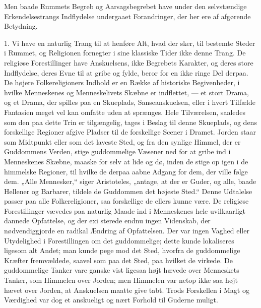 \documentclass[12pt,a4paper]{article}
\newcommand{\opage}[1]{\marginnote{\footnotesize\textit{[#1]}}}
\begin{document}
Men baade Rummets Begreb og Aarsagsbegrebet have under den selvstændige
Erkendelsestrangs Indflydelse undergaaet Forandringer, der her ere af
afgørende Betydning.

\medskip

1. Vi have en naturlig Trang til at henføre Alt, hvad der sker, til
bestemte Steder i Rummet, og Religionen fornegter i sine klassiske Tider
ikke denne Trang. De religiøse Forestillinger have Anskuelsens, ikke
Begrebets Karakter, og deres store Indflydelse, deres Evne til at gribe og
fylde, beror for en ikke ringe Del derpaa. De højere Folkereligioners
Indhold er en Række af historiske Begivenheder, i hvilke Menneskenes og
Menneskelivets Skæbne er indflettet, --- et stort Drama, og et Drama, der
spilles paa en Skueplads, Sanseanskuelsen, eller i hvert Tilfælde
Fantasien meget vel kan omfatte uden at sprænges. Hele Tilværelsen,
saaledes som den paa dette Trin er tilgængelig, tages i Beslag til denne
Skueplads, og dens forskellige Regioner afgive Pladser til de forskellige
Scener i Dramet. Jorden staar som Midtpunkt eller som det laveste Sted, og
fra den synlige Himmel, der er Guddommens Verden, stige guddommelige
Væsener ned for at gribe ind i Menneskenes Skæbne, maaske for selv at lide
og dø, inden de stige op igen i de himmelske Regioner, til hvilke de
derpaa aabne Adgang for dem, der ville følge dem. „Alle Mennesker,“ siger
Aristoteles, „antage, at der er Guder, og alle, baade Hellener og
Barbarer, tildele de Guddommen det højeste Sted.“ Denne Udtalelse passer
paa alle Folkereligioner, saa forskellige de ellers kunne være. De
religiøse Forestillinger vævedes paa naturlig Maade ind i Menneskenes hele
uvilkaarligt dannede Opfattelse, og der exi%
\opage{5}sterede endnu ingen Videnskab,
der nødvendiggjorde en radikal Ændring af Opfattelsen. Der var ingen
Vaghed eller Utydelighed i Forestillingen om det guddommelige; dette kunde
lokaliseres ligesom alt Andet; man kunde pege mod det Sted, hvorfra de
guddommelige Kræfter fremvældede, saavel som paa det Sted, paa hvilket de
virkede. De guddommelige Tanker vare ganske vist ligesaa højt hævede over
Menneskets Tanker, som Himmelen over Jorden; men Himmelen var netop ikke
saa højt hævet over Jorden, at Anskuelsen maatte give tabt. Trods
Forskellen i Magt og Værdighed var dog et anskueligt og nært Forhold til
Guderne muligt.
\end{document}
